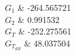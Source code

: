 $G_1$	&	-264.565721\\\hline
$G_2$	&	0.991532\\\hline
$G_T$	&	-252.275561\\\hline
$G_{T_{dB}}$	&	48.037504\\\hline
